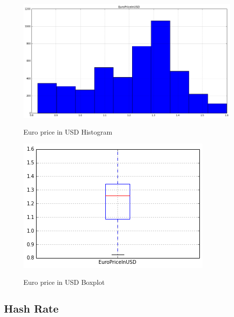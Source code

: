 \begin{figure}[bth]
  \myfloatalign
  {\includegraphics[width=1\linewidth]
    {gfx/euro-price-in-usd-histogram}} 
  \caption{Euro price in USD Histogram}
  \label{fig:euro-price-in-usd-histogram}
\end{figure}

\begin{figure}[bth]
  \myfloatalign
  {\includegraphics[width=1\linewidth]
    {gfx/euro-price-in-usd-boxplot}}
  \caption{Euro price in USD Boxplot}
  \label{fig:euro-price-in-usd-boxplot}
\end{figure}

\clearpage


\subsection{Hash Rate}
\label{sec:hash-rate}

